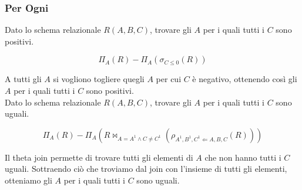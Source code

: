 \subsubsection{Per Ogni}

Dato lo schema relazionale $R(A,B,C)$, trovare gli $A$ per i quali tutti i $C$ sono positivi.

\begin{displaymath}
  \Pi_{A}(R) - \Pi_{A}(\sigma_{C \leq 0}(R))
\end{displaymath}

A tutti gli $A$ si vogliono togliere quegli $A$ per cui $C$ è negativo, ottenendo così
gli $A$ per i quali tutti i $C$ sono positivi. \\

\noindent
Dato lo schema relazionale $R(A,B,C)$, trovare gli $A$ per i quali tutti i $C$ sono uguali.

\begin{displaymath}
  \Pi_{A}(R) - \Pi_{A}(R \bowtie_{A=A^1 \land C \neq C^1}(\rho_{A^1,B^1,C^1 \Leftarrow A,B,C}(R)))
\end{displaymath}

Il theta join permette di trovare tutti gli elementi di $A$ che non hanno tutti i $C$ uguali.
Sottraendo ciò che troviamo dal join con l'insieme di tutti gli elementi, otteniamo gli $A$ per
i quali tutti i $C$ sono uguali.
